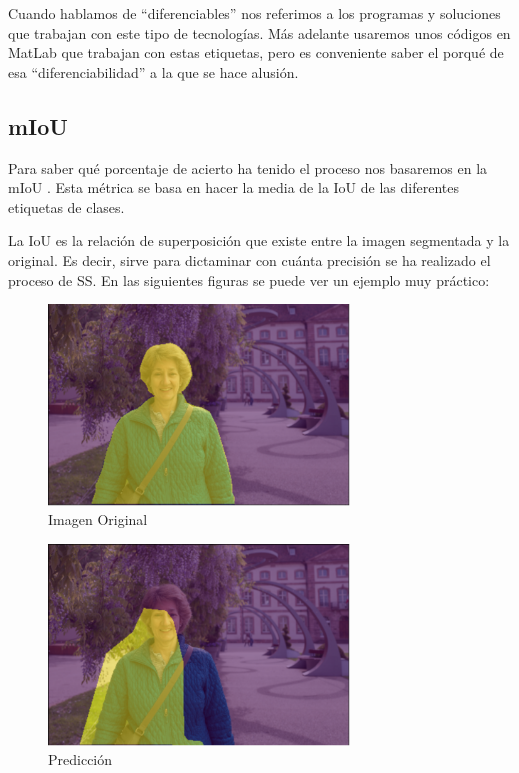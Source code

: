Cuando hablamos de ``diferenciables'' nos referimos a los programas y soluciones que trabajan con este tipo de tecnologías. Más adelante usaremos unos códigos en MatLab que trabajan con estas etiquetas, pero es conveniente saber el porqué de esa ``diferenciabilidad'' a la que se hace alusión.

\subsection{mIoU}

Para saber qué porcentaje de acierto ha tenido el proceso nos basaremos en la \ac{mIoU} \cite{miou-iou}. Esta métrica se basa en hacer la media de la \ac{IoU} de las diferentes etiquetas de clases.

La \ac{IoU} \cite{miou-iou} es la relación de superposición que existe entre la imagen segmentada y la original. Es decir, sirve para dictaminar con cuánta precisión se ha realizado el proceso de \ac{SS}. En las siguientes figuras se puede ver un ejemplo muy práctico:

\begin{figure}[H]
  \centering
  \includegraphics[width=8cm]{Figuras/Iou_1.eps}
  \caption{Imagen Original}
\end{figure}

\begin{figure}[H]
  \centering
  \includegraphics[width=8cm]{Figuras/IoU_2.eps}
  \caption{Predicción}
\end{figure}


